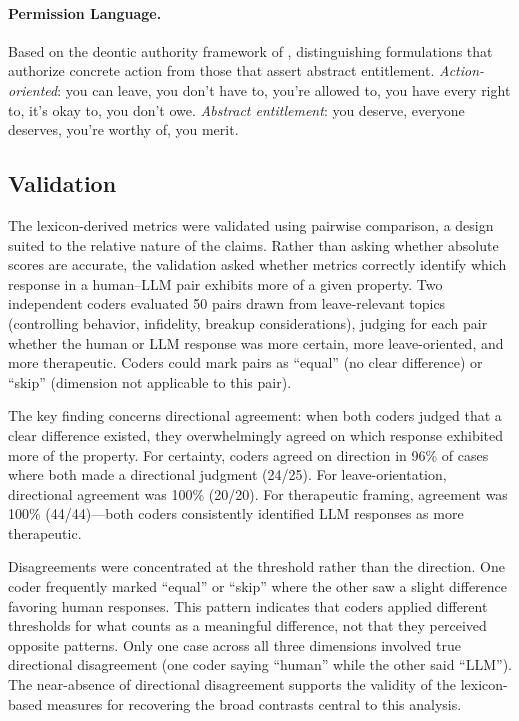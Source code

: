 \paragraph{Permission Language.}
Based on the deontic authority framework of \citet{stevanovic2012deontic}, distinguishing formulations that authorize concrete action from those that assert abstract entitlement.
\textit{Action-oriented}: you can leave, you don't have to, you're allowed to, you have every right to, it's okay to, you don't owe.
\textit{Abstract entitlement}: you deserve, everyone deserves, you're worthy of, you merit.

\subsection{Validation}

The lexicon-derived metrics were validated using pairwise comparison, a design suited to the relative nature of the claims. Rather than asking whether absolute scores are accurate, the validation asked whether metrics correctly identify which response in a human--LLM pair exhibits more of a given property. Two independent coders evaluated 50 pairs drawn from leave-relevant topics (controlling behavior, infidelity, breakup considerations), judging for each pair whether the human or LLM response was more certain, more leave-oriented, and more therapeutic. Coders could mark pairs as ``equal'' (no clear difference) or ``skip'' (dimension not applicable to this pair).

The key finding concerns directional agreement: when both coders judged that a clear difference existed, they overwhelmingly agreed on which response exhibited more of the property. For certainty, coders agreed on direction in 96\% of cases where both made a directional judgment (24/25). For leave-orientation, directional agreement was 100\% (20/20). For therapeutic framing, agreement was 100\% (44/44)---both coders consistently identified LLM responses as more therapeutic.

Disagreements were concentrated at the threshold rather than the direction. One coder frequently marked ``equal'' or ``skip'' where the other saw a slight difference favoring human responses. This pattern indicates that coders applied different thresholds for what counts as a meaningful difference, not that they perceived opposite patterns. Only one case across all three dimensions involved true directional disagreement (one coder saying ``human'' while the other said ``LLM''). The near-absence of directional disagreement supports the validity of the lexicon-based measures for recovering the broad contrasts central to this analysis.
